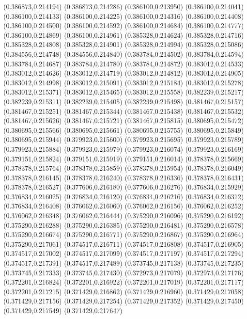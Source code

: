 (0.386873,0.214194)
(0.386873,0.214286)
(0.386100,0.213950)
(0.386100,0.214041)
(0.386100,0.214133)
(0.386100,0.214225)
(0.386100,0.214316)
(0.386100,0.214408)
(0.386100,0.214500)
(0.386100,0.214592)
(0.386100,0.214684)
(0.386100,0.214777)
(0.386100,0.214869)
(0.386100,0.214961)
(0.385328,0.214624)
(0.385328,0.214716)
(0.385328,0.214808)
(0.385328,0.214901)
(0.385328,0.214994)
(0.385328,0.215086)
(0.384556,0.214748)
(0.384556,0.214840)
(0.383784,0.214502)
(0.383784,0.214594)
(0.383784,0.214687)
(0.383784,0.214780)
(0.383784,0.214872)
(0.383012,0.214533)
(0.383012,0.214626)
(0.383012,0.214719)
(0.383012,0.214812)
(0.383012,0.214905)
(0.383012,0.214998)
(0.383012,0.215091)
(0.383012,0.215184)
(0.383012,0.215278)
(0.383012,0.215371)
(0.383012,0.215465)
(0.383012,0.215558)
(0.382239,0.215217)
(0.382239,0.215311)
(0.382239,0.215405)
(0.382239,0.215498)
(0.381467,0.215157)
(0.381467,0.215251)
(0.381467,0.215344)
(0.381467,0.215438)
(0.381467,0.215532)
(0.381467,0.215626)
(0.381467,0.215721)
(0.381467,0.215815)
(0.380695,0.215472)
(0.380695,0.215566)
(0.380695,0.215661)
(0.380695,0.215755)
(0.380695,0.215849)
(0.380695,0.215944)
(0.379923,0.215600)
(0.379923,0.215695)
(0.379923,0.215789)
(0.379923,0.215884)
(0.379923,0.215979)
(0.379923,0.216074)
(0.379923,0.216169)
(0.379151,0.215824)
(0.379151,0.215919)
(0.379151,0.216014)
(0.378378,0.215669)
(0.378378,0.215764)
(0.378378,0.215859)
(0.378378,0.215954)
(0.378378,0.216049)
(0.378378,0.216145)
(0.378378,0.216240)
(0.378378,0.216336)
(0.378378,0.216431)
(0.378378,0.216527)
(0.377606,0.216180)
(0.377606,0.216276)
(0.376834,0.215929)
(0.376834,0.216025)
(0.376834,0.216120)
(0.376834,0.216216)
(0.376834,0.216312)
(0.376834,0.216408)
(0.376062,0.216060)
(0.376062,0.216156)
(0.376062,0.216252)
(0.376062,0.216348)
(0.376062,0.216444)
(0.375290,0.216096)
(0.375290,0.216192)
(0.375290,0.216288)
(0.375290,0.216385)
(0.375290,0.216481)
(0.375290,0.216578)
(0.375290,0.216674)
(0.375290,0.216771)
(0.375290,0.216867)
(0.375290,0.216964)
(0.375290,0.217061)
(0.374517,0.216711)
(0.374517,0.216808)
(0.374517,0.216905)
(0.374517,0.217002)
(0.374517,0.217099)
(0.374517,0.217197)
(0.374517,0.217294)
(0.374517,0.217391)
(0.374517,0.217489)
(0.373745,0.217138)
(0.373745,0.217235)
(0.373745,0.217333)
(0.373745,0.217430)
(0.372973,0.217079)
(0.372973,0.217176)
(0.372201,0.216824)
(0.372201,0.216922)
(0.372201,0.217019)
(0.372201,0.217117)
(0.372201,0.217215)
(0.371429,0.216862)
(0.371429,0.216960)
(0.371429,0.217058)
(0.371429,0.217156)
(0.371429,0.217254)
(0.371429,0.217352)
(0.371429,0.217450)
(0.371429,0.217549)
(0.371429,0.217647)
